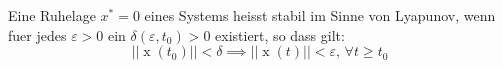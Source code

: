 Eine Ruhelage $x^* = 0$ eines Systems heisst stabil im Sinne von Lyapunov, wenn fuer jedes $\varepsilon > 0$ ein $\delta(\varepsilon, t_0) > 0$ existiert, so dass gilt:
$$|| \operatorname{x}(t_0) || < \delta \implies || \operatorname{x}(t) || < \varepsilon, \, \forall t \geq t_0$$
